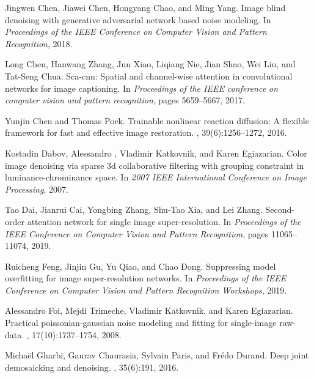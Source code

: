 \documentclass[10pt,twocolumn,letterpaper]{article}
\begin{document}
{\begin{thebibliography}{10}
	Jingwen Chen, Jiawei Chen, Hongyang Chao, and Ming Yang.
	\newblock Image blind denoising with generative adversarial network based noise
	modeling.
	\newblock In {\em Proceedings of the IEEE Conference on Computer Vision and
		Pattern Recognition}, 2018.
	
	Long Chen, Hanwang Zhang, Jun Xiao, Liqiang Nie, Jian Shao, Wei Liu, and
	Tat-Seng Chua.
	\newblock Sca-cnn: Spatial and channel-wise attention in convolutional networks
	for image captioning.
	\newblock In {\em Proceedings of the IEEE conference on computer vision and
		pattern recognition}, pages 5659--5667, 2017.
	
	Yunjin Chen and Thomas Pock.
	\newblock Trainable nonlinear reaction diffusion: A flexible framework for fast
	and effective image restoration.
	,
	39(6):1256--1272, 2016.
	
	Kostadin Dabov, Alessandro  , Vladimir Katkovnik, and Karen Egiazarian.
	\newblock Color image denoising via sparse 3d collaborative filtering with
	grouping constraint in luminance-chrominance space.
	\newblock In {\em 2007 IEEE International Conference on Image Processing},
	2007.
	
	Tao Dai, Jianrui Cai, Yongbing Zhang, Shu-Tao Xia, and Lei Zhang.
	\newblock Second-order attention network for single image super-resolution.
	\newblock In {\em Proceedings of the IEEE Conference on Computer Vision and
		Pattern Recognition}, pages 11065--11074, 2019.
	
	Ruicheng Feng, Jinjin Gu, Yu Qiao, and Chao Dong.
	\newblock Suppressing model overfitting for image super-resolution networks.
	\newblock In {\em Proceedings of the IEEE Conference on Computer Vision and
		Pattern Recognition Workshops}, 2019.
	
	Alessandro Foi, Mejdi Trimeche, Vladimir Katkovnik, and Karen Egiazarian.
	\newblock Practical poissonian-gaussian noise modeling and fitting for
	single-image raw-data.
	, 17(10):1737--1754, 2008.
	
	Micha{\"e}l Gharbi, Gaurav Chaurasia, Sylvain Paris, and Fr{\'e}do Durand.
	\newblock Deep joint demosaicking and denoising.
	, 35(6):191, 2016.
	

\end{thebibliography}}
\end{document}
